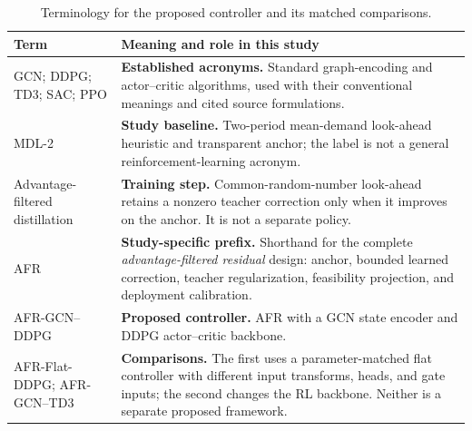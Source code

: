 \documentclass[preprint,review,12pt]{elsarticle}
\begin{document}
\begin{table}[htbp]
\centering
\footnotesize
\caption{Terminology for the proposed controller and its matched comparisons.}
\label{tab:method_terminology}
\setlength{\tabcolsep}{5pt}
\renewcommand{\arraystretch}{1.10}
\begin{tabularx}{\textwidth}{>{\raggedright\arraybackslash}p{} >{\raggedright\arraybackslash}X}
\toprule
Term & Meaning and role in this study \\
\midrule
GCN; DDPG; TD3; SAC; PPO & \textbf{Established acronyms.} Standard graph-encoding and actor--critic algorithms, used with their conventional meanings and cited source formulations. \\
MDL-2 & \textbf{Study baseline.} Two-period mean-demand look-ahead heuristic and transparent anchor; the label is not a general reinforcement-learning acronym. \\
Advantage-filtered distillation & \textbf{Training step.} Common-random-number look-ahead retains a nonzero teacher correction only when it improves on the anchor. It is not a separate policy. \\
AFR & \textbf{Study-specific prefix.} Shorthand for the complete \emph{advantage-filtered residual} design: anchor, bounded learned correction, teacher regularization, feasibility projection, and deployment calibration. \\
AFR-GCN--DDPG & \textbf{Proposed controller.} AFR with a GCN state encoder and DDPG actor--critic backbone. \\
AFR-Flat-DDPG; AFR-GCN--TD3 & \textbf{Comparisons.} The first uses a parameter-matched flat controller with different input transforms, heads, and gate inputs; the second changes the RL backbone. Neither is a separate proposed framework. \\
\bottomrule
\end{tabularx}
\end{table}
\end{document}
